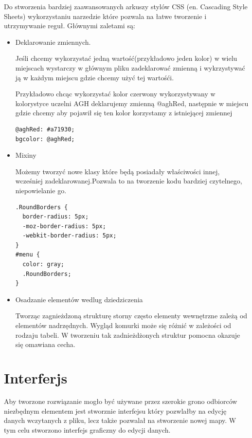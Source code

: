 Do stworzenia bardziej zaawansowanych arkuszy stylów CSS (en. Cascading Style Sheets) wykorzystaniu narzedzie które pozwala na łatwe tworzenie i utrzymywanie reguł. Głównymi zaletami są:

\begin{itemize}
\item
Deklarowanie zmiennych.

Jeśli chcemy wykorzystać jedną wartość(przykładowo jeden kolor) w wielu miejscach wystarczy w głównym pliku zadeklarować zmienną i wykrzystywać ją w każdym miejscu gdzie chcemy użyć tej wartośći.

Przykładowo chcąc wykorzystać kolor czerwony wykorzystywany w kolorystyce uczelni AGH deklarujemy zmienną @aghRed, następnie w miejscu gdzie chcemy aby pojawił się ten kolor korzystamy z istniejącej zmiennej

\lstset{language=JavaScript}
\label{lis:webSql}
\begin{lstlisting}[caption=json]
@aghRed: #a71930;
bgcolor: @aghRed;
\end{lstlisting}

\item
Mixiny

Możemy tworzyć nowe klasy które będą posiadały właściwości innej, wcześniej zadeklarowanej.Pozwala to na tworzenie kodu bardziej czytelnego, niepowielanie go.


\lstset{language=JavaScript}
\label{lis:webSql}
\begin{lstlisting}[caption=json]
.RoundBorders {
  border-radius: 5px;
  -moz-border-radius: 5px;
  -webkit-border-radius: 5px;
}
#menu {
  color: gray;
  .RoundBorders;
}
\end{lstlisting}

\item
Osadzanie elementów wedlug dziedziczenia

Tworząc zagnieżdzoną strukturę storny często elementy wewnętrzne zależą od elementów nadrzędnych. Wygląd komurki może się różnić w zależości od rodzaju tabeli. W tworzeniu tak zadnieżdżonych struktur pomocna okazuje się omawiana cecha.

\end{itemize}


\section{Interferjs}
\label{sec:Interferjs}

Aby tworzone rozwiązanie mogło być używane przez szerokie grono odbiorców niezbędnym elementem jest stworznie interfejsu który pozwlałby na edycję danych wczytanych z pliku, lecz także pozwalał na stworzenie nowej mapy. W tym celu stworzono interfejs graficzny do edycji danych.
